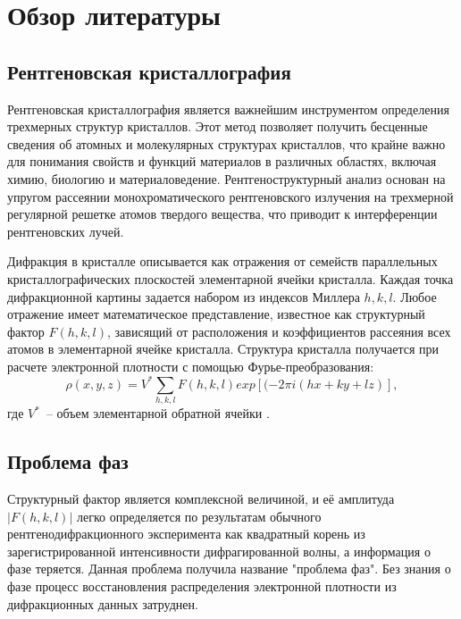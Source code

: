 \section{Обзор литературы}

\subsection{Рентгеновская кристаллография}


Рентгеновская кристаллография является важнейшим инструментом определения трехмерных структур кристаллов. Этот метод позволяет получить бесценные сведения об атомных и молекулярных структурах кристаллов, что крайне важно для понимания свойств и функций материалов в различных областях, включая химию, биологию и материаловедение. Рентгеноструктурный анализ основан на упругом рассеянии монохроматического рентгеновского излучения на трехмерной регулярной решетке атомов твердого вещества, что приводит к интерференции рентгеновских лучей.

Дифракция в кристалле описывается как отражения от семейств параллельных кристаллографических плоскостей элементарной ячейки кристалла. Каждая точка дифракционной картины задается набором из индексов Миллера $h,k,l$. Любое отражение имеет математическое представление, известное как структурный фактор $F(h,k,l)$, зависящий от расположения и коэффициентов рассеяния всех
атомов в элементарной ячейке кристалла. Структура кристалла получается при расчете электронной плотности с помощью Фурье-преобразования: \[\rho(x, y, z) = V^*\sum_{h,k,l} F(h,k,l) exp[(-2\pi i (hx+ky+lz)],\] где $V^*$~-- объем элементарной обратной ячейки \cite{giro}. 

\subsection{Проблема фаз}

Структурный фактор является комплексной величиной, и её амплитуда  $|F(h,k,l)|$ легко определяется по результатам обычного рентгенодифракционного эксперимента как квадратный корень из зарегистрированной интенсивности дифрагированной волны, а информация о фазе теряется. Данная проблема получила название "проблема фаз". Без знания о фазе процесс восстановления распределения электронной плотности из дифракционных данных затруднен.

